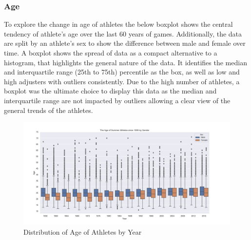 \documentclass[a4 paper, 12pt]{article}
\begin{document}
        \subsubsection{Age}
        To explore the change in age of athletes the below boxplot shows the central tendency of athlete's age over the last 60 years of games. Additionally, the data are split by an athlete's sex to show the difference between male and female over time. A boxplot shows the spread of data as a compact alternative to a histogram, that highlights the general nature of the data. It identifies the median and interquartile range (25th to 75th) percentile as the box, as well as low and high adjusters with outliers consistently. Due to the high number of athletes, a boxplot was the ultimate choice to display this data as the median and interquartile range are not impacted by outliers allowing a clear view of the general trends of the athletes. 
        \begin{figure} [H]
            \centering
            \includegraphics[width=\textwidth, frame]
                {./images/graph/athlete_age_boxplot.png}      
                \caption{Distribution of Age of Athletes by Year} 
        \end{figure}
         
\end{document}
